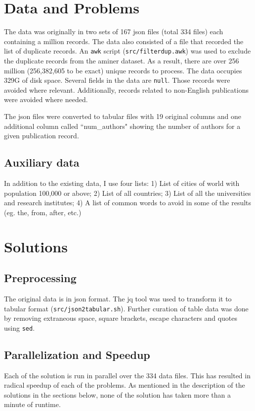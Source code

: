 \documentclass{report}
\begin{document}
\section*{Data and Problems}
The data was originally in two sets of 167 json files (total 334 files) each
containing a million records. The data also consisted of a file that recorded
the list of duplicate records. An \texttt{awk} script (\texttt{src/filterdup.awk}) was used to exclude the
duplicate records from the aminer dataset. As a result, there are over 256
million (256,382,605 to be exact) unique records to process. The data occupies
329G of disk space. Several fields in the data are \texttt{null}. Those records
were avoided where relevant. Additionally, records related to non-English
publications were avoided where needed.

The json files were converted to tabular files with 19 original columns and one
additional column called ``num\_authors" showing the number of authors for a given
publication record.

\subsection*{Auxiliary data}
In addition to the existing data, I use four lists: 1) List of cities of
world with population 100,000 or above; 2) List of all countries;
3) List of all the universities and research institutes; 4) A list of common
words to avoid in some of the results (eg. the, from, after, etc.)

\section*{Solutions}
\subsection*{Preprocessing}
The original data is in json format. The jq tool was used to transform it to
tabular format (\texttt{src/json2tabular.sh}). Further curation of table data
was done by removing extraneous space, square brackets, escape characters and
quotes using \texttt{sed}.

\subsection*{Parallelization and Speedup}
Each of the solution is run in parallel over the 334 data files. This has
resulted in radical speedup of each of the problems. As mentioned in the
description of the solutions in the sections below, none of the solution has
taken more than a minute of runtime.
\end{document}
